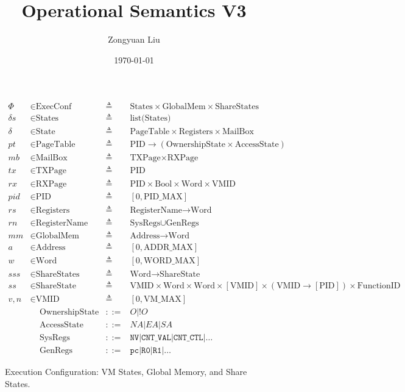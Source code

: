 \documentclass[a4paper]{article}
\title{Operational Semantics V3} \date{\today}
\author{Zongyuan Liu}
\newcommand*{\defined}{\triangleq}
\newcommand*{\maps}{\rightarrow}
\newcommand*{\derived}{::=}
\newcommand*{\CONF}{\text{ExecConf}}
\newcommand*{\STATE}{\text{State}}
\newcommand*{\MEM}{\text{GlobalMem}}
\newcommand*{\SSS}{\text{ShareStates}}
\newcommand*{\PID}{\text{PID}}
\newcommand*{\PT}{\text{PageTable}}
\newcommand*{\AS}{\text{AccessState}}
\newcommand*{\OS}{\text{OwnershipState}}
\newcommand*{\REGS}{\text{Registers}}
\newcommand*{\ADDR}{\text{Address}}
\newcommand*{\WORD}{\text{Word}}
\newcommand*{\VMID}{\text{VMID}}
\newcommand*{\REGNAMES}{\text{RegisterName}}
\newcommand*{\MB}{\text{MailBox}}
\newcommand*{\PAMAX}{\text{ADDR\_MAX}}
\newcommand*{\PPIDMAX}{\text{PID\_MAX}}
\newcommand*{\PWMAX}{\text{WORD\_MAX}}
\newcommand*{\PVMMAX}{\text{VM\_MAX}}
\begin{document}

\begin{figure}[!htb]
  \begin{align*}
    \Phi &\in \CONF &\defined &\text{States} \times \MEM \times \SSS \\
    \delta s &\in \text{States} &\defined &\text{list(States)} \\
    \delta &\in \STATE &\defined &\PT \times \REGS \times \MB \\
    pt & \in \PT & \defined & \PID \maps (\OS \times \AS) \\
    mb & \in \MB &\defined &\text{TXPage} \times  \text{RXPage}\\
    tx & \in \text{TXPage} &\defined &\PID\\
    rx & \in \text{RXPage} &\defined &\PID \times \text{Bool} \times \WORD \times \VMID \\
    pid & \in \PID &\defined  &[ 0, \PPIDMAX ] \\
    rs & \in \REGS &\defined  &\REGNAMES \maps \WORD \\
    rn & \in \REGNAMES &\defined &\text{SysRegs} \cup \text{GenRegs} \\
    mm & \in \MEM &\defined  &\ADDR \maps \WORD \\
    a & \in \ADDR &\defined  &[ 0, \PAMAX ] \\
    w & \in \WORD &\defined  &[ 0, \PWMAX ] \\
    sss & \in \SSS &\defined  &\WORD \maps \text{ShareState} \\
    ss & \in \text{ShareState} &\defined &\VMID \times \WORD \times \WORD \times [\VMID] \times (\VMID \maps [\PID]) \times \text{FunctionID}\\
    v,n & \in \VMID &\defined  &[ 0, \PVMMAX ] \\
      & \;\;\;\; \OS & \derived & O | !O \\
      & \;\;\;\; \AS & \derived & NA | EA | SA \\
      & \;\;\;\; \text{SysRegs} &\derived & \mathtt{NV} | \mathtt{CNT\_VAL} | \mathtt{CNT\_CTL} | \dots \\
         & \;\;\;\; \text{GenRegs} &\derived & \mathtt{pc} | \mathtt {R0} | \mathtt{R1} | \dots
  \end{align*}
  \caption{Execution Configuration: VM States, Global Memory, and Share States.}
\end{figure}
\end{document}
